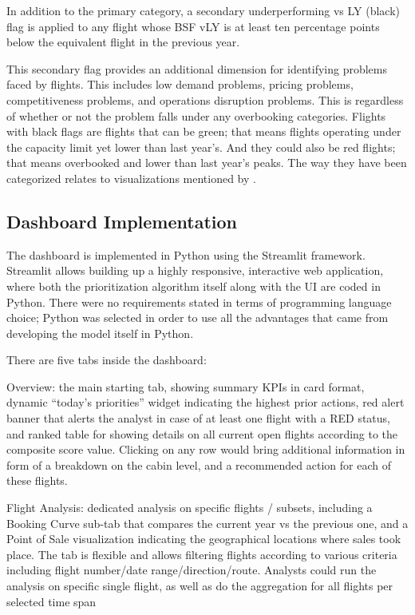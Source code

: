 In addition to the primary category, a secondary underperforming vs LY (black) flag is applied to any flight whose BSF vLY is at least ten percentage points below the equivalent flight in the previous year.

This secondary flag provides an additional dimension for identifying problems faced by flights. This includes low demand problems, pricing problems, competitiveness problems, and operations disruption problems. This is regardless of whether or not the problem falls under any overbooking categories. Flights with black flags are flights that can be green; that means flights operating under the capacity limit yet lower than last year's. And they could also be red flights; that means overbooked and lower than last year's peaks. The way they have been categorized relates to visualizations mentioned by \citet{YigitbasiogluVelcu2012}.

\subsection{Dashboard Implementation}

The dashboard is implemented in Python using the Streamlit framework. Streamlit allows building up a highly responsive, interactive web application, where both the prioritization algorithm itself along with the UI are coded in Python. There were no requirements stated in terms of programming language choice; Python was selected in order to use all the advantages that came from developing the model itself in Python.

There are five tabs inside the dashboard:

Overview: the main starting tab, showing summary KPIs in card format, dynamic ``today's priorities'' widget indicating the highest prior actions, red alert banner that alerts the analyst in case of at least one flight with a RED status, and ranked table for showing details on all current open flights according to the composite score value. Clicking on any row would bring additional information in form of a breakdown on the cabin level, and a recommended action for each of these flights.

Flight Analysis: dedicated analysis on specific flights / subsets, including a Booking Curve sub-tab that compares the current year vs the previous one, and a Point of Sale visualization indicating the geographical locations where sales took place. The tab is flexible and allows filtering flights according to various criteria including flight number/date range/direction/route. Analysts could run the analysis on specific single flight, as well as do the aggregation for all flights per selected time span

